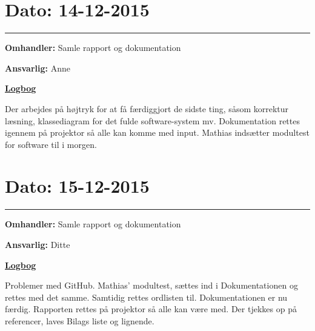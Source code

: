 \section{Dato: 14-12-2015}
\hrule
\textbf{Omhandler:} Samle rapport og dokumentation

\textbf{Ansvarlig:} Anne

\underline{\textbf{Logbog}}

Der arbejdes på højtryk for at få færdiggjort de sidste ting, såsom korrektur læsning, klassediagram for det fulde software-system mv.
Dokumentation rettes igennem på projektor så alle kan komme med input. Mathias indsætter modultest for software til i morgen. 
\\

\section{Dato: 15-12-2015}
\hrule
\textbf{Omhandler:} Samle rapport og dokumentation

\textbf{Ansvarlig:} Ditte

\underline{\textbf{Logbog}}

Problemer med GitHub. Mathias' modultest, sættes ind i Dokumentationen og rettes med det samme. Samtidig rettes ordlisten til. Dokumentationen er nu færdig. Rapporten rettes på projektor så alle kan være med. Der tjekkes op på referencer, laves Bilags liste og lignende. 
\\